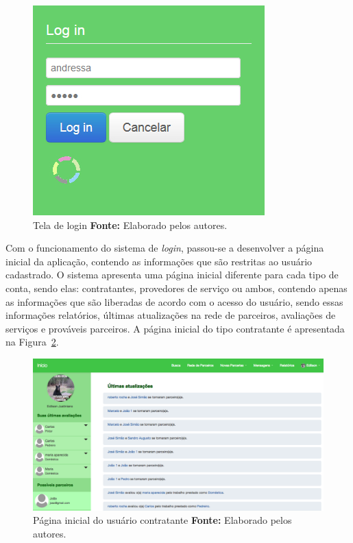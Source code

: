 \begin{figure}[h!]
	\centerline{\includegraphics[scale=0.60]{./imagens/login.jpg}}
	\caption[Tela de login ]
	{Tela de login \textbf{Fonte:} Elaborado pelos autores.}
	\label{fig:pagina_login}
\end{figure}

\par Com o funcionamento do sistema de \textit{login}, passou-se a desenvolver a página inicial da aplicação, contendo as informações que são restritas ao usuário cadastrado. O sistema apresenta uma página inicial diferente para cada tipo de conta, sendo elas: contratantes, provedores de serviço ou ambos, contendo apenas as informações que são liberadas de acordo com o acesso do usuário, sendo essas informações relatórios, últimas atualizações na rede de parceiros, avaliações de serviços e prováveis parceiros. A página inicial do tipo contratante é apresentada na Figura~\ref{fig:pagina_inicial_contratante}.

\newpage
\begin{figure}[h!]
	\centerline{\includegraphics[scale=0.3]{./imagens/home-contratante.png}}
	\caption[Página inicial do usuário contratante]
	{Página inicial do usuário contratante \textbf{Fonte:} Elaborado pelos autores.}
	\label{fig:pagina_inicial_contratante}
\end{figure}


